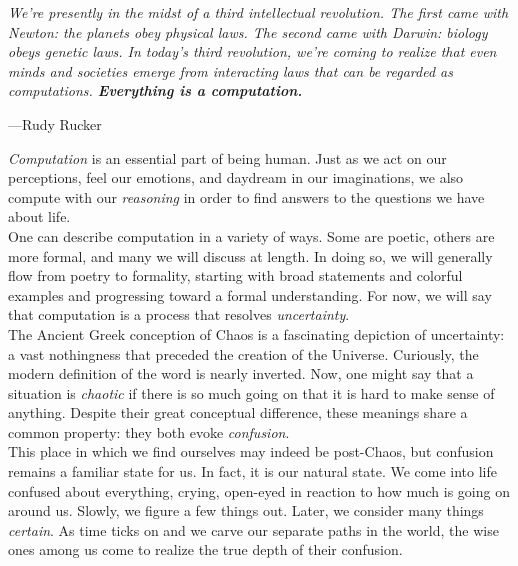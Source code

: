 \vspace{4mm}
\begin{displayquote}
	\textit{We're presently in the midst of a third intellectual revolution. The first came with Newton: the planets obey physical laws. The second came with Darwin: biology obeys genetic laws. In today’s third revolution, we're coming to realize that even minds and societies emerge from interacting laws that can be regarded as computations. \textbf{Everything is a computation.}}
	\begin{flushright}
		---Rudy Rucker
	\end{flushright}
\end{displayquote}
\vspace{4mm}

\textit{Computation} is an essential part of being human. Just as we act on our perceptions, feel our emotions, and daydream in our imaginations, we also compute with our \textit{reasoning} in order to find answers to the questions we have about life. \\

One can describe computation in a variety of ways. Some are poetic, others are more formal, and many we will discuss at length. In doing so, we will generally flow from poetry to formality, starting with broad statements and colorful examples and progressing toward a formal understanding. For now, we will say that computation is a process that resolves \textit{uncertainty}. \\

The Ancient Greek conception of Chaos is a fascinating depiction of uncertainty: a vast nothingness that preceded the creation of the Universe. Curiously, the modern definition of the word is nearly inverted. Now, one might say that a situation is \textit{chaotic} if there is so much going on that it is hard to make sense of anything. Despite their great conceptual difference, these meanings share a common property: they both evoke \textit{confusion}. \\

This place in which we find ourselves may indeed be post-Chaos, but confusion remains a familiar state for us. In fact, it is our natural state. We come into life confused about everything, crying, open-eyed in reaction to how much is going on around us. Slowly, we figure a few things out. Later, we consider many things \textit{certain}. As time ticks on and we carve our separate paths in the world, the wise ones among us come to realize the true depth of their confusion. \\

